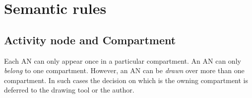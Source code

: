 \section{Semantic rules}







\subsection{Activity node and Compartment}

Each AN can only appear once in a particular compartment.  An AN can only \emph{belong} to one compartment. However, an AN can be \emph{drawn} over more than one compartment. In such cases the decision on which is the owning compartment is deferred to the drawing tool or the author. 

